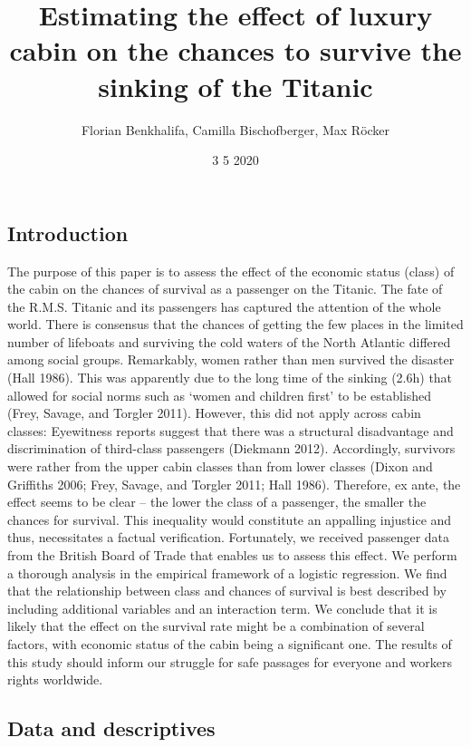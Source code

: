 \documentclass[
]{article}
\title{Estimating the effect of luxury cabin on the chances to survive the
sinking of the Titanic}
\author{Florian Benkhalifa, Camilla Bischofberger, Max Röcker}
\date{3 5 2020}
\begin{document}
\maketitle

\hypertarget{introduction}{%
\subsection{Introduction}\label{introduction}}

The purpose of this paper is to assess the effect of the economic status
(class) of the cabin on the chances of survival as a passenger on the
Titanic. The fate of the R.M.S. Titanic and its passengers has captured
the attention of the whole world. There is consensus that the chances of
getting the few places in the limited number of lifeboats and surviving
the cold waters of the North Atlantic differed among social groups.
Remarkably, women rather than men survived the disaster (Hall 1986).
This was apparently due to the long time of the sinking (2.6h) that
allowed for social norms such as `women and children first' to be
established (Frey, Savage, and Torgler 2011). However, this did not
apply across cabin classes: Eyewitness reports suggest that there was a
structural disadvantage and discrimination of third-class passengers
(Diekmann 2012). Accordingly, survivors were rather from the upper cabin
classes than from lower classes (Dixon and Griffiths 2006; Frey, Savage,
and Torgler 2011; Hall 1986). Therefore, ex ante, the effect seems to be
clear -- the lower the class of a passenger, the smaller the chances for
survival. This inequality would constitute an appalling injustice and
thus, necessitates a factual verification. Fortunately, we received
passenger data from the British Board of Trade that enables us to assess
this effect. We perform a thorough analysis in the empirical framework
of a logistic regression. We find that the relationship between class
and chances of survival is best described by including additional
variables and an interaction term. We conclude that it is likely that
the effect on the survival rate might be a combination of several
factors, with economic status of the cabin being a significant one. The
results of this study should inform our struggle for safe passages for
everyone and workers rights worldwide.

\hypertarget{data-and-descriptives}{%
\subsection{Data and descriptives}\label{data-and-descriptives}}
\end{document}
